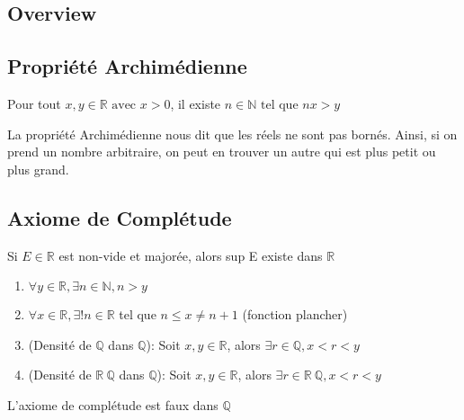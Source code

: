 \documentclass{article}
\begin{document}
\subsection{Overview}

\subsection{Propriété Archimédienne}

\begin{theorem}
    Pour tout $x,y \in \mathbb{R} \text{ avec } x>0$, il existe $ n \in \mathbb{N}
    \text{ tel que } nx>y$
\end{theorem}

\begin{remark}
    La propriété Archimédienne nous dit que les réels ne sont pas bornés. Ainsi,
    si on prend un nombre arbitraire, on peut en trouver un autre qui est plus
    petit ou plus grand.
\end{remark}

\subsection{Axiome de Complétude}

\begin{proposition}
    Si $E \in \mathbb{R}$ est non-vide et majorée, alors sup E existe dans
    $\mathbb{R}$
\end{proposition}

\begin{corollary}
    \begin{enumerate}
	\item $ \forall y \in \mathbb{R}, \exists n \in \mathbb{N}, n>y$
	\item $ \forall x \in \mathbb{R}, \exists! n \in \mathbb{R}$ tel que
	    $n \leq x \neq n+1$ (fonction plancher)
	\item (Densité de $\mathbb{Q}$ dans $\mathbb{Q}$): Soit $x,y \in \mathbb{R}$,
	    alors $\exists r \in \mathbb{Q}, x<r<y$
	\item (Densité de $\mathbb{R} \ \mathbb{Q}$ dans $\mathbb{Q}$): Soit $x,y \in \mathbb{R}$,
	    alors $\exists r \in \mathbb{R} \ \mathbb{Q}, x<r<y$
    \end{enumerate}
\end{corollary}

\begin{theorem}
    L'axiome de complétude est faux dans $\mathbb{Q}$
\end{theorem}
\end{document}
